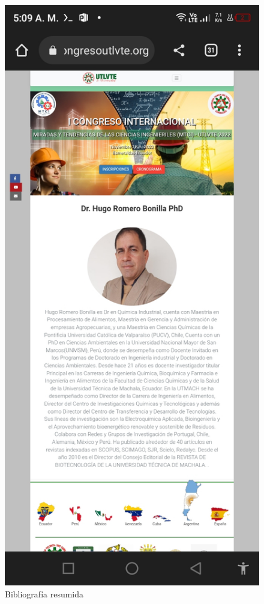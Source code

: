 \documentclass[a4paper,14px]{article}
\begin{document}
\hspace{0.5cm}
\begin{minipage}[H]{0.5\linewidth}
  \begin{figure}[H]
    \centering
    \includegraphics[scale=0.3]{bibliografia2.jpg}
    \caption{Bibliografía resumida}
    \label{fig:bibliografia}
  \end{figure}
\end{minipage}
  
\end{document}
